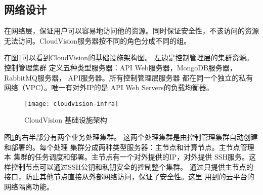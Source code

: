 \subsection{网络设计}
在网络层，保证用户可以容易地访问他的资源。同时保证安全性，不该访问的资源
无法访问。CloudVision服务器按不同的角色分成不同的组。

在图\ref{fig:cloudvision-infra}可以看到CloudVision的基础设施架构图。
左边是控制管理层的集群资源。控制管理集群
定义五种类型服务器：API Web服务器，MongoDB服务器，
RabbitMQ服务器， API服务器。所有控制管理层服务器
都在同一个独立的私有网络（VPC）。唯一有对外IP的是
API Web Servers的负载均衡器。
\begin{figure}[h]
  \centering
    \texttt{[image: cloudvision-infra]}
  \caption{CloudVision 基础设施架构}
  \label{fig:cloudvision-infra}
\end{figure}

图\ref{fig:cloudvision-infra}的右半部分有两个业务处理集群。
这两个处理集群是由控制管理集群自动创建和部署的。每个处理
集群分成两种类型服务器：主节点和计算节点。主节点管理本
集群的任务调度和部署。主节点有一个对外提供的IP，对外提供
SSH服务。这样控制节点可以通过SSH公钥和私钥安全的控制整个集群。
通过只提供主节点的接口，防止其他节点直接从外部网络访问，保证了安全性。这里
用到的云平台的网络隔离功能。

